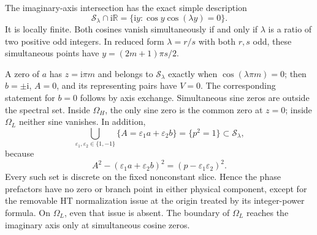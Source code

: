 \documentclass[11pt]{article}
\numberwithin{equation}{section}
\theoremstyle{definition}
\newcommand{\R}{\mathbb R}
\newcommand{\ii}{\mathrm i}
\newcommand{\eps}{\varepsilon}
\newcommand{\cS}{\mathcal S}
\newcommand{\OH}{\Omega_H}
\newcommand{\OL}{\Omega_L}
\begin{document}
The imaginary-axis intersection has the exact simple description
\begin{equation}\label{eq:imagaxisS}
 \cS_\lambda\cap\ii\R
 =\{\ii y:\cos y\cos(\lambda y)=0\}.
\end{equation}
It is locally finite. Both cosines vanish simultaneously if and only
if \(\lambda\) is a ratio of two positive odd integers. In reduced
form \(\lambda=r/s\) with both \(r,s\) odd, these simultaneous
points have \(y=(2m+1)\pi s/2\).

A zero of \(a\) has \(z=\ii\pi m\) and belongs
to \(\cS_\lambda\) exactly when \(\cos(\lambda\pi m)=0\);
then \(b=\pm\ii\), \(A=0\), and its representing pairs have
\(V=0\). The corresponding statement for \(b=0\) follows by
axis exchange. Simultaneous sine zeros are outside the spectral set.
Inside \(\OH\), the only sine zero is the common zero at \(z=0\);
inside \(\OL\) neither sine vanishes. In addition,
\begin{equation}\label{eq:cornerp}
 \bigcup_{\eps_1,\eps_2\in\{1,-1\}}
 \{A=\eps_1 a+\eps_2b\}=\{p^2=1\}\subset\cS_\lambda,
\end{equation}
because
\[
 A^2-(\eps_1 a+\eps_2 b)^2=(p-\eps_1\eps_2)^2.
\]
Every such set is discrete on the fixed nonconstant slice. Hence
the phase prefactors have no zero or branch point in either physical
component, except for the removable HT normalization issue at the
origin treated by its integer-power formula. On \(\OL\), even that
issue is absent. The boundary of \(\OL\) reaches the imaginary axis
only at simultaneous cosine zeros.
\end{document}
